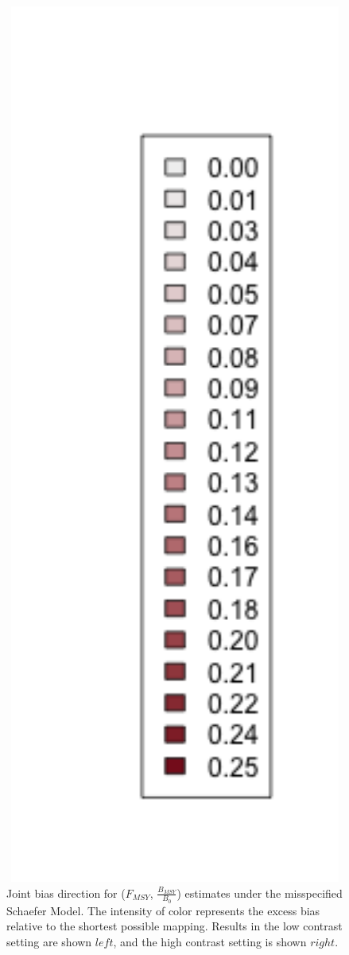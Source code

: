 \documentclass[12pt]{article}
\begin{document}
\begin{figure}[h!]
\begin{minipage}[h!]{0.44\textwidth}
\end{minipage}
\begin{minipage}[h!]{0.09\textwidth}
\hspace{-1cm}
\includegraphics[width=1.5\textwidth]{../ptNew/subLegnd.png}
\end{minipage}
\caption{
Joint bias direction for ($F_{MSY}$, $\frac{B_{MSY}}{B_0}$) estimates under 
the misspecified Schaefer Model. The intensity of color represents the excess 
bias relative to the shortest possible mapping. Results in the low contrast setting 
are shown $left$, and the high contrast setting is shown $right$.
}
\label{arrowsPT}
\end{figure}
\end{document}
